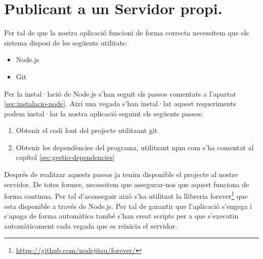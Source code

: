 \section{Publicant a un Servidor propi.}

Per tal de que la nostra aplicació funcioni de forma correcta necessitem que els sistema disposi de les següents utilitats:

\begin{itemize}
\item{Node.js}
\item{Git}
\end{itemize}

Per la instal·lació de Node.js s'han seguit els passos comentats a l'apartat \ref{sec:instalacio-node}. Així una vegada s'han instal·lat aquest requeriments podem instal·lar la nostra aplicació seguint els següents passos: 

\begin{enumerate}
\item{Obtenir el codi font del projecte utilitzant git}
\item{Obtenir les dependències del programa, utilitzant npm com s'ha comentat al capítol \ref{sec:gestio-dependencies}}
\end{enumerate}

Després de realitzar aquests passos ja tenim disponible el projecte al nostre servidor. De totes formes, necessitem que assegurar-nos que aquest funciona de forma continua. Per tal d'aconseguir això s'ha utilitzat la llibreria forever\footnote{\url{https://github.com/nodejitsu/forever/}} que esta disponible a través de Node.js. Per tal de garantir que l'aplicació s'engega i s'apaga de forma automàtica també s'han creat scripts per a que s'executin automàticament cada vegada que es reinicia el servidor.

